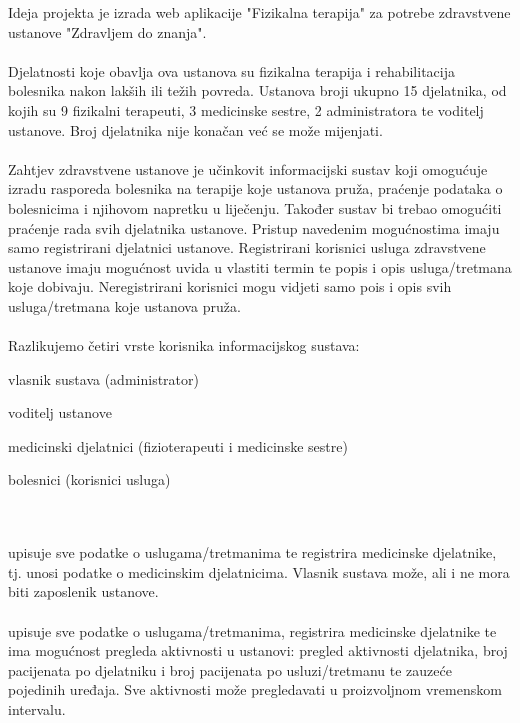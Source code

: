 		Ideja projekta je izrada web aplikacije "Fizikalna terapija" za potrebe zdravstvene ustanove "Zdravljem do znanja". \\ \\
		Djelatnosti koje obavlja ova ustanova su fizikalna terapija i rehabilitacija bolesnika nakon lakših ili težih povreda. Ustanova broji ukupno 15 djelatnika, od kojih su 9 fizikalni terapeuti, 3 medicinske sestre, 2 administratora te voditelj ustanove. Broj djelatnika nije konačan već se može mijenjati. \\ \\
		Zahtjev zdravstvene ustanove je učinkovit informacijski sustav koji omogućuje izradu rasporeda bolesnika na terapije koje ustanova pruža, praćenje podataka o bolesnicima i njihovom napretku u liječenju. Također sustav bi trebao omogućiti praćenje rada svih djelatnika ustanove. Pristup navedenim mogućnostima imaju samo registrirani djelatnici ustanove. Registrirani korisnici usluga zdravstvene ustanove imaju mogućnost uvida u vlastiti termin te popis i opis usluga/tretmana koje dobivaju. Neregistrirani korisnici mogu vidjeti samo pois i opis svih usluga/tretmana koje ustanova pruža.\\ \\
		Razlikujemo četiri vrste korisnika informacijskog sustava:
		\begin{packed_item}
			\item vlasnik sustava (administrator)
			\item voditelj ustanove
			\item medicinski djelatnici (fizioterapeuti i medicinske sestre)
			\item bolesnici (korisnici usluga)
		\end{packed_item}	
		\\\\
		 upisuje sve podatke o uslugama/tretmanima te registrira medicinske djelatnike, tj. unosi podatke o medicinskim djelatnicima. Vlasnik sustava može, ali i ne mora biti zaposlenik ustanove.\\\\
		\parindent{} upisuje sve podatke o uslugama/tretmanima, registrira medicinske djelatnike te ima mogućnost pregleda aktivnosti u ustanovi: pregled aktivnosti djelatnika, broj pacijenata po djelatniku i broj pacijenata po usluzi/tretmanu te zauzeće pojedinih uređaja. Sve aktivnosti može pregledavati u proizvoljnom vremenskom intervalu.\\\\
